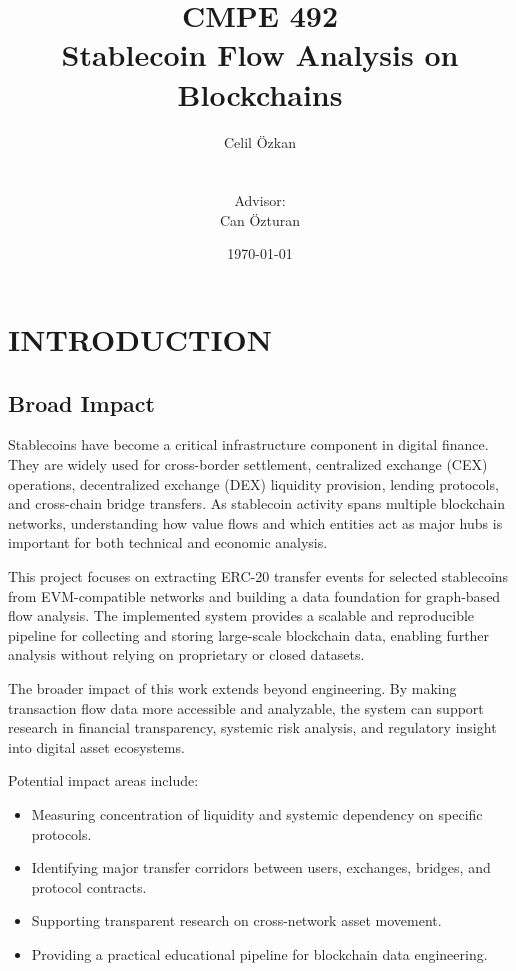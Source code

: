 \documentclass[a4paper,12pt]{report}
\begin{document}
\title{CMPE 492 \\ Stablecoin Flow Analysis on Blockchains}
\author{
Celil Özkan \\
\\ \\
Advisor: \\ 
Can Özturan
}
\date{\today}
\maketitle{}
\tableofcontents

\chapter{INTRODUCTION}


\section{Broad Impact}

Stablecoins have become a critical infrastructure component in digital finance. They are widely used for cross-border settlement, centralized exchange (CEX) operations, decentralized exchange (DEX) liquidity provision, lending protocols, and cross-chain bridge transfers. As stablecoin activity spans multiple blockchain networks, understanding how value flows and which entities act as major hubs is important for both technical and economic analysis.

This project focuses on extracting ERC-20 transfer events for selected stablecoins from EVM-compatible networks and building a data foundation for graph-based flow analysis. The implemented system provides a scalable and reproducible pipeline for collecting and storing large-scale blockchain data, enabling further analysis without relying on proprietary or closed datasets.

The broader impact of this work extends beyond engineering. By making transaction flow data more accessible and analyzable, the system can support research in financial transparency, systemic risk analysis, and regulatory insight into digital asset ecosystems.

Potential impact areas include:
\begin{itemize}
\item Measuring concentration of liquidity and systemic dependency on specific protocols.
\item Identifying major transfer corridors between users, exchanges, bridges, and protocol contracts.
\item Supporting transparent research on cross-network asset movement.
\item Providing a practical educational pipeline for blockchain data engineering.
\end{itemize}
\end{document}

